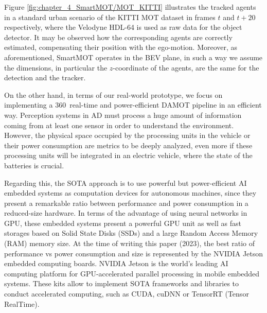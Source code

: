 Figure \ref{fig:chapter_4_SmartMOT/MOT_KITTI} illustrates the tracked agents in a standard urban scenario of the KITTI \ac{MOT} dataset in frames $t$ and $t+20$ respectively, where the Velodyne HDL-64 is used as raw data for the object detector. It may be observed how the corresponding agents are correctly estimated, compensating their position with the ego-motion. Moreover, as aforementioned, SmartMOT operates in the \ac{BEV} plane, in such a way we assume the dimensions, in particular the $z$-coordinate of the agents, are the same for the detection and the tracker.


On the other hand, in terms of our real-world prototype, we focus on implementing a 360\degree~real-time and power-efficient \ac{DAMOT} pipeline in an efficient way. Perception systems in \ac{AD} must process a huge amount of information coming from at least one sensor in order to understand the environment. However, the physical space occupied by the processing units in the vehicle or their power consumption are metrics to be deeply analyzed, even more if these processing units will be integrated in an electric vehicle, where the state of the batteries is crucial. 

Regarding this, the \ac{SOTA} approach is to use powerful but power-efficient \ac{AI} embedded systems as computation devices for autonomous machines, since they present a remarkable ratio between performance and power consumption in a reduced-size hardware. In terms of the advantage of using neural networks in \ac{GPU}, these embedded systems present a powerful \ac{GPU} unit as well as fast storages based on Solid State Disks (SSDs) and a large Random Access Memory (RAM) memory size. At the time of writing this paper (2023), the best ratio of performance vs power consumption and size is represented by the NVIDIA Jetson embedded computing boards. NVIDIA Jetson is the world's leading \ac{AI} computing platform for \ac{GPU}-accelerated parallel processing in mobile embedded systems. These kits allow to implement \ac{SOTA} frameworks and libraries to conduct accelerated computing, such as \ac{CUDA}, cuDNN or TensorRT (Tensor RealTime). 

